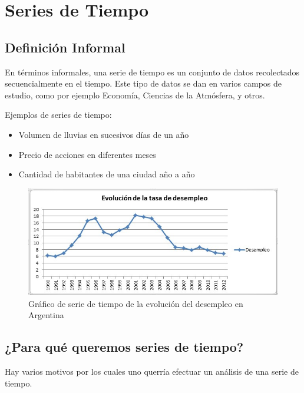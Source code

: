 \section{Series de Tiempo}
\label{sec:time_series}

\theoremstyle{definition}
\newtheorem{definicion}{Definición}

\subsection*{Definición Informal}
En términos informales, una serie de tiempo es un conjunto de datos recolectados secuencialmente en el tiempo. Este tipo de datos se dan en varios campos de estudio, como por ejemplo Economía, Ciencias de la Atmósfera, y otros.

Ejemplos de series de tiempo:

\begin{itemize}
    \item Volumen de lluvias en sucesivos días de un año
    \item Precio de acciones en diferentes meses
    \item Cantidad de habitantes de una ciudad año a año
\end{itemize}

\begin{figure}
\centering
\includegraphics[width=15cm]{images/desocupacion.jpg}
\caption{Gráfico de serie de tiempo de la evolución del desempleo en Argentina \label{desocupacion}}
\end{figure}


\subsection*{¿Para qué queremos series de tiempo?}

Hay varios motivos por los cuales uno querría efectuar un análisis de una serie de tiempo.

